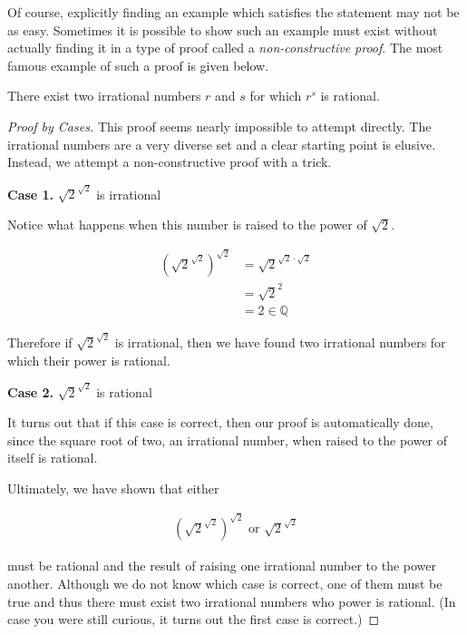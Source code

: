 \documentclass[twoside]{report}
\newcommand{\header}[2]{\begin{flushright} \textbf{#1} #2 \end{flushright}}
\begin{document}
Of course, explicitly finding an example which satisfies the statement may not be as easy. Sometimes it is possible to show such an example must exist without actually finding it in a type of proof called a \emph{non-constructive proof}.  The most famous example of such a proof is given below.

\vspace{\baselineskip}
\begin{theorem}
	There exist two irrational numbers $r$ and $s$ for which $r^s$ is rational.
\end{theorem}

\begin{proof}[Proof by Cases]
	This proof seems nearly impossible to attempt directly. The irrational numbers are a very diverse set and a clear starting point is elusive. Instead, we attempt a non-constructive proof with a trick.
	
	\header{Case 1. }{$\sqrt{2}^{\sqrt{2}}$ is irrational}
	Notice what happens when this number is raised to the power of $\sqrt{2}$.
	
	\begin{align*}
		\left( \sqrt{2}^{\sqrt{2}} \right)^{\sqrt{2}} &= \sqrt{2}^{\sqrt{2} \cdot \sqrt{2}} \\
		&= \sqrt{2}^2 \\
		&= 2 \in \mathbb{Q}
	\end{align*}
	
	Therefore if $\sqrt{2}^{\sqrt{2}}$ is irrational, then we have found two irrational numbers for which their power is rational.
	
	\header{Case 2. }{$\sqrt{2}^{\sqrt{2}}$ is rational}
	
	It turns out that if this case is correct, then our proof is automatically done, since the square root of two, an irrational number, when raised to the power of itself is rational.
	
	Ultimately, we have shown that either
	
	\begin{align*}
		\left( \sqrt{2}^{\sqrt{2}} \right)^{\sqrt{2}} \text{ or } \sqrt{2}^{\sqrt{2}}
	\end{align*}
	
	must be rational and the result of raising one irrational number to the power another. Although we do not know which case is correct, one of them must be true and thus there must exist two irrational numbers who power is rational. (In case you were still curious, it turns out the first case is correct.)
\end{proof}
\vspace{\baselineskip}
\end{document}
